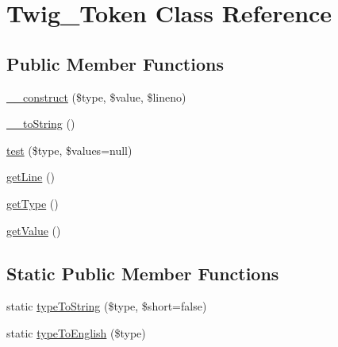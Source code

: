 \hypertarget{class_twig___token}{}\section{Twig\+\_\+\+Token Class Reference}
\label{class_twig___token}
\subsection*{Public Member Functions}
\begin{DoxyCompactItemize}
\item 
\hyperlink{class_twig___token_afa1726e5a634e7f5e8504348748dc93a}{\+\_\+\+\_\+construct} (\$type, \$value, \$lineno)
\item 
\hyperlink{class_twig___token_a7516ca30af0db3cdbf9a7739b48ce91d}{\+\_\+\+\_\+to\+String} ()
\item 
\hyperlink{class_twig___token_a9cdad590920515cc2bb0fc6bccaf462a}{test} (\$type, \$values=null)
\item 
\hyperlink{class_twig___token_aef9c32f6066788a101028a1d4150f8cb}{get\+Line} ()
\item 
\hyperlink{class_twig___token_a830b5c75df72b32396701bc563fbe3c7}{get\+Type} ()
\item 
\hyperlink{class_twig___token_ac0bc18784b182c89fcfd276625aef435}{get\+Value} ()
\end{DoxyCompactItemize}
\subsection*{Static Public Member Functions}
\begin{DoxyCompactItemize}
\item 
static \hyperlink{class_twig___token_a5ce0f7a389a79b91d2bba173802c1d22}{type\+To\+String} (\$type, \$short=false)
\item 
static \hyperlink{class_twig___token_a66c50051ad0ab474c853fddfdfc3b8f9}{type\+To\+English} (\$type)
\end{DoxyCompactItemize}
